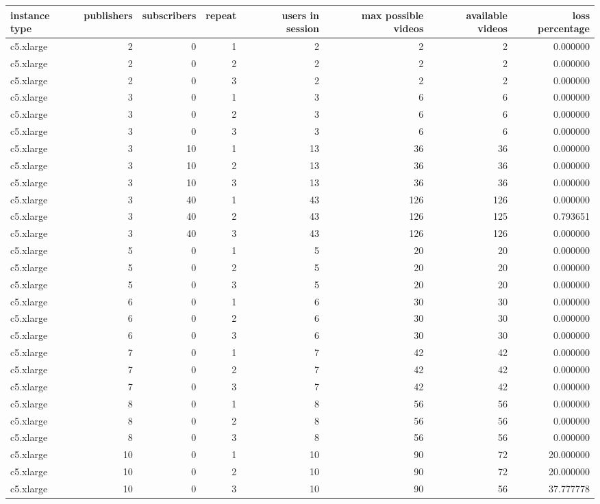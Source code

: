 \begin{tabular}{lrrrrrrr}
\toprule
instance type & publishers & subscribers & repeat & users in session & max possible videos & available videos & loss percentage \\
\midrule
c5.xlarge & 2 & 0 & 1 & 2 & 2 & 2 & 0.000000 \\
c5.xlarge & 2 & 0 & 2 & 2 & 2 & 2 & 0.000000 \\
c5.xlarge & 2 & 0 & 3 & 2 & 2 & 2 & 0.000000 \\
c5.xlarge & 3 & 0 & 1 & 3 & 6 & 6 & 0.000000 \\
c5.xlarge & 3 & 0 & 2 & 3 & 6 & 6 & 0.000000 \\
c5.xlarge & 3 & 0 & 3 & 3 & 6 & 6 & 0.000000 \\
c5.xlarge & 3 & 10 & 1 & 13 & 36 & 36 & 0.000000 \\
c5.xlarge & 3 & 10 & 2 & 13 & 36 & 36 & 0.000000 \\
c5.xlarge & 3 & 10 & 3 & 13 & 36 & 36 & 0.000000 \\
c5.xlarge & 3 & 40 & 1 & 43 & 126 & 126 & 0.000000 \\
c5.xlarge & 3 & 40 & 2 & 43 & 126 & 125 & 0.793651 \\
c5.xlarge & 3 & 40 & 3 & 43 & 126 & 126 & 0.000000 \\
c5.xlarge & 5 & 0 & 1 & 5 & 20 & 20 & 0.000000 \\
c5.xlarge & 5 & 0 & 2 & 5 & 20 & 20 & 0.000000 \\
c5.xlarge & 5 & 0 & 3 & 5 & 20 & 20 & 0.000000 \\
c5.xlarge & 6 & 0 & 1 & 6 & 30 & 30 & 0.000000 \\
c5.xlarge & 6 & 0 & 2 & 6 & 30 & 30 & 0.000000 \\
c5.xlarge & 6 & 0 & 3 & 6 & 30 & 30 & 0.000000 \\
c5.xlarge & 7 & 0 & 1 & 7 & 42 & 42 & 0.000000 \\
c5.xlarge & 7 & 0 & 2 & 7 & 42 & 42 & 0.000000 \\
c5.xlarge & 7 & 0 & 3 & 7 & 42 & 42 & 0.000000 \\
c5.xlarge & 8 & 0 & 1 & 8 & 56 & 56 & 0.000000 \\
c5.xlarge & 8 & 0 & 2 & 8 & 56 & 56 & 0.000000 \\
c5.xlarge & 8 & 0 & 3 & 8 & 56 & 56 & 0.000000 \\
c5.xlarge & 10 & 0 & 1 & 10 & 90 & 72 & 20.000000 \\
c5.xlarge & 10 & 0 & 2 & 10 & 90 & 72 & 20.000000 \\
c5.xlarge & 10 & 0 & 3 & 10 & 90 & 56 & 37.777778 \\
\bottomrule
\end{tabular}
